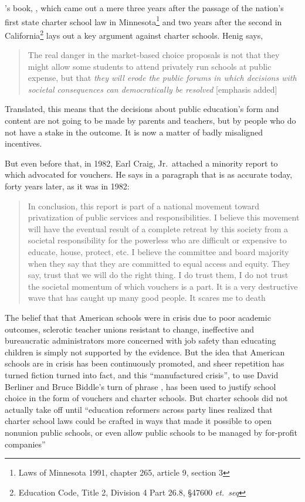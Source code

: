 \textcite{Henig1994}'s book, , which came out a mere three years after the passage of the nation's first state charter school law in Minnesota\footnote{Laws of Minnesota 1991, chapter 265, article 9, section 3} and two years after the second in California\footnote{Education Code, Title 2, Division 4 Part 26.8, §47600 \textit{et.\ seq}} lays out a key argument against charter schools. Henig says,

\blockquote[{\parencite[\emph{xiii}]{Henig1994}}]{\OnehalfSpacing%
  The real danger in the market-based choice proposals is not that they might allow some students to attend privately run schools at public expense, but that \emph{they will erode the public forums in which decisions with societal consequences can democratically be resolved} [emphasis added]}.
Translated, this means that the decisions about public education's form and content are not going to be made by parents and teachers, but by people who do not have a stake in the outcome. It is now a matter of badly misaligned incentives. %

But even before that, in 1982, Earl Craig, Jr.\ attached a minority report to  which advocated for vouchers. He says in a paragraph that is as accurate today, forty years later, as it was in 1982: 

\blockquote[{\parencite[48]{CitizensLeagueEducationAlternativesCommittee1982}}][]{\OnehalfSpacing%
In conclusion, this report is part of a national movement toward privatization of public services and responsibilities. I believe this movement will have the eventual result of a complete retreat by this society from a societal responsibility for the powerless who are difficult or expensive to educate, house, protect, etc. I believe the committee and board majority when they say that they are committed to equal access and equity. They say, trust that we will do the right thing. I do trust them, I do not trust the societal momentum of which vouchers is a part. It is a very destructive wave that has caught up many good people. It scares me to death}.\vspace{-0.25\baselineskip}

The belief that that American schools were in crisis due to poor academic outcomes, sclerotic teacher unions resistant to change, ineffective and bureaucratic administrators more concerned with job safety than educating children is simply not supported by the evidence. But the idea that American schools are in crisis has been continuously promoted, and sheer repetition has turned fiction turned into fact, and this ``manufactured crisis'', to use David Berliner and Bruce Biddle's turn of phrase \parencite{Berliner.Biddle1997}, has been used to justify school choice in the form of vouchers and charter schools. But charter schools did not actually take off until ``education reformers across party lines realized that charter school laws could be crafted in ways that made it possible to open nonunion public schools, or even allow public schools to be managed by for-profit companies'' \parencite[172]{Goldstein2015}

